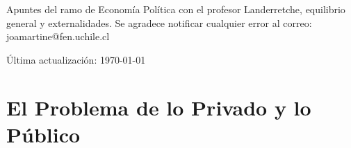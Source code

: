 \documentclass[12pt]{book}
\begin{document}
Apuntes del ramo de Economía Política con el profesor Landerretche, equilibrio general y externalidades. Se agradece notificar cualquier error al correo: joamartine@fen.uchile.cl

Última actualización: \today

\newpage

\setcounter{chapter}{2}

\chapter{El Problema de lo Privado y lo Público}



\newpage



\begin{appendices}
    
\end{appendices}
\end{document}
